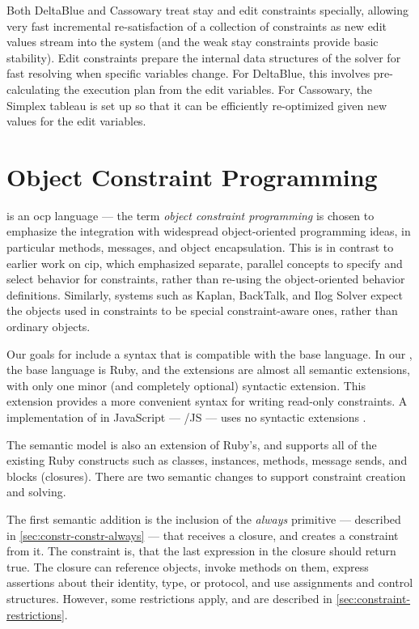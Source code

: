 Both DeltaBlue and Cassowary treat stay and edit constraints
specially, allowing very fast incremental re-satisfaction of a
collection of constraints as new edit values stream into the system
(and the weak stay constraints provide basic stability). Edit
constraints prepare the internal data structures of the solver for
fast resolving when specific variables change. For DeltaBlue, this
involves pre-calculating the execution plan from the edit variables.
For Cassowary, the Simplex tableau is set up so that it can be
efficiently re-optimized given new values for the edit variables.

\section{Object Constraint Programming}
\label{sec:object-constraint-programming}
\langname is an \ac{ocp} language --- the term \emph{object constraint
  programming} is chosen to emphasize the integration with widespread
object-oriented programming ideas, in particular methods, messages,
and object encapsulation.  This is in contrast to earlier work on
\ac{cip}, which emphasized separate, parallel concepts to specify and
select behavior for constraints, rather than re-using the
object-oriented behavior definitions.  Similarly, systems 
such as Kaplan, BackTalk, and Ilog Solver 
expect the objects used in constraints to be special constraint-aware
ones, rather than ordinary objects.

Our goals for \langname include a syntax that is compatible with the
base language. In our \DIFdelbegin {}\DIFdelend \DIFaddbegin {}\DIFaddend \toolname, the base language is Ruby,
and the extensions are almost all semantic extensions, with only one
minor (and completely optional) syntactic extension. This extension
provides a more convenient syntax for writing read-only constraints. A
\DIFdelbegin {}\DIFdelend \DIFaddbegin {}\DIFaddend implementation of \langname in JavaScript ---
\langname/JS --- uses no syntactic extensions \DIFaddbegin {}\DIFaddend .

The semantic model is also an extension of Ruby's, and supports all of
the existing Ruby constructs such as classes, instances, methods,
message sends, and blocks (closures). There are two semantic changes
to support constraint creation and solving.

The first semantic addition is the inclusion of the \emph{always}
primitive --- described in \autoref{sec:constr-constr-always} --- that
receives a closure, and creates a constraint from it. The constraint
is, that the last expression in the closure should return true. The
closure can reference objects, invoke methods on them, express
assertions about their identity, type, or protocol, and use
assignments and control structures. However, some restrictions apply,
and are described in \autoref{sec:constraint-restrictions}.

